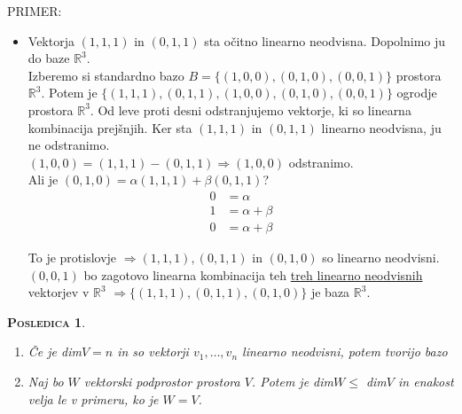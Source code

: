 \documentclass[a4paper,12pt]{article}
\newtheorem*{posledica}{\textsc{Posledica}}
\begin{document}
PRIMER: 
\begin{itemize}
\item Vektorja $(1,1,1)$ in $(0,1,1)$ sta očitno linearno neodvisna. Dopolnimo ju do baze $\mathbb{R}^3$. \\

Izberemo si standardno bazo $B=\{(1,0,0),(0,1,0),(0,0,1)\}$ prostora $\mathbb{R}^3$. Potem je $\{(1,1,1),(0,1,1),(1,0,0),(0,1,0),(0,0,1)\}$ ogrodje prostora $\mathbb{R}^3$. Od leve proti desni odstranjujemo vektorje, ki so linearna kombinacija prejšnjih. Ker sta $(1,1,1)$ in $(0,1,1)$ linearno neodvisna, ju ne odstranimo. \\

$(1,0,0)=(1,1,1)-(0,1,1)\Rightarrow (1,0,0)$ odstranimo. \\

Ali je $(0,1,0)=\alpha(1,1,1)+\beta(0,1,1)$?
\begin{align*}
0 &= \alpha \\
1 &=\alpha + \beta \\
0 & = \alpha+\beta
\end{align*}

To je protislovje $\Rightarrow (1,1,1),(0,1,1)$ in $(0,1,0)$ so linearno neodvisni. \\

$(0,0,1)$ bo zagotovo linearna kombinacija teh \underline{treh linearno neodvisnih} vektorjev v \underline{$\mathbb{R}^3$} $\Rightarrow \{(1,1,1),(0,1,1),(0,1,0)\}$ je baza $\mathbb{R}^3$.\\ 
\end{itemize}

\begin{posledica}~
\begin{enumerate}
\item Če je dim$V=n$ in so vektorji $v_1,\ldots,v_n$ linearno neodvisni, potem tvorijo bazo
\item Naj bo $W$ vektorski podprostor prostora $V$. Potem je dim$W \leq$ dim$V$ in enakost velja le v primeru, ko je $W=V$. \\
\end{enumerate}
\end{posledica}
\end{document}
